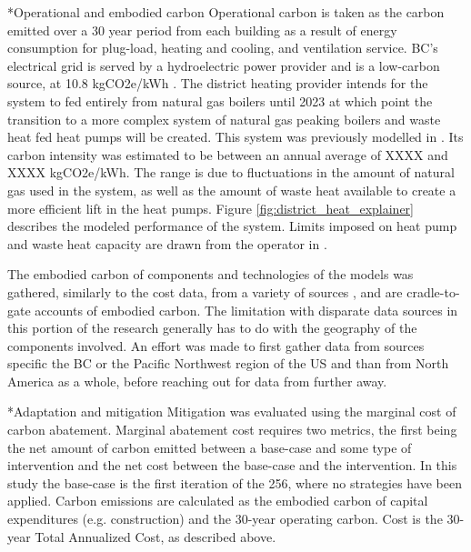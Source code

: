 \documentclass[twocolumn, a4paper,10pt]{article}
\makeatletter
\renewcommand\subsection{\@startsection{subsection}{1}{\z@}{\z@}{\z@}{\normalfont\normalsize\bfseries}}
\renewcommand\subsection{\@startsection{subsection}{1}{\z@}{\z@}{0.1pt}{\normalfont\normalsize\bfseries}}
\makeatother
\begin{document}
\begin{equation}\label{eq:TAC}
  
\end{equation}

\subsection*{Operational and embodied carbon}
Operational carbon is taken as the carbon emitted over a 30 year period from each building as a result of energy consumption for plug-load, heating and cooling, and ventilation service. BC's electrical grid is served by a hydroelectric power provider and is a low-carbon source, at 10.8 kgCO2e/kWh \citep{BC hydro methods}. The district heating provider intends for the system to fed entirely from natural gas boilers until 2023 at which point the transition to a more complex system of natural gas peaking boilers and waste heat fed heat pumps will be created. This system was previously modelled in \citet{SRN paper}. Its carbon intensity was estimated to be between an annual average of XXXX and XXXX kgCO2e/kWh. The range is due to fluctuations in the amount of natural gas used in the system, as well as the amount of waste heat available to create a more efficient lift in the heat pumps. Figure \ref{fig:district_heat_explainer} describes the modeled performance of the system. Limits imposed on heat pump and waste heat capacity are drawn from the operator in \citet{CORIX infrastructure agreement}.

The embodied carbon of components and technologies of the models was gathered, similarly to the cost data, from a variety of sources \citep{ec3, ICE db, Rodriguez Droguett, Rodriguez}, and are cradle-to-gate accounts of embodied carbon. The limitation with disparate data sources in this portion of the research generally has to do with the geography of the components involved. An effort was made to first gather data from sources specific the BC or the Pacific Northwest region of the US and than from North America as a whole, before reaching out for data from further away. 

\subsection*{Adaptation and mitigation}
Mitigation was evaluated using the marginal cost of carbon abatement. Marginal abatement cost requires two metrics, the first being the net amount of carbon emitted between a base-case and some type of intervention and the net cost between the base-case and the intervention. In this study the base-case is the first iteration of the 256, where no strategies have been applied. Carbon emissions are calculated as the embodied carbon of capital expenditures (e.g. construction) and the 30-year operating carbon. Cost is the 30-year Total Annualized Cost, as described above. 
\end{document}
